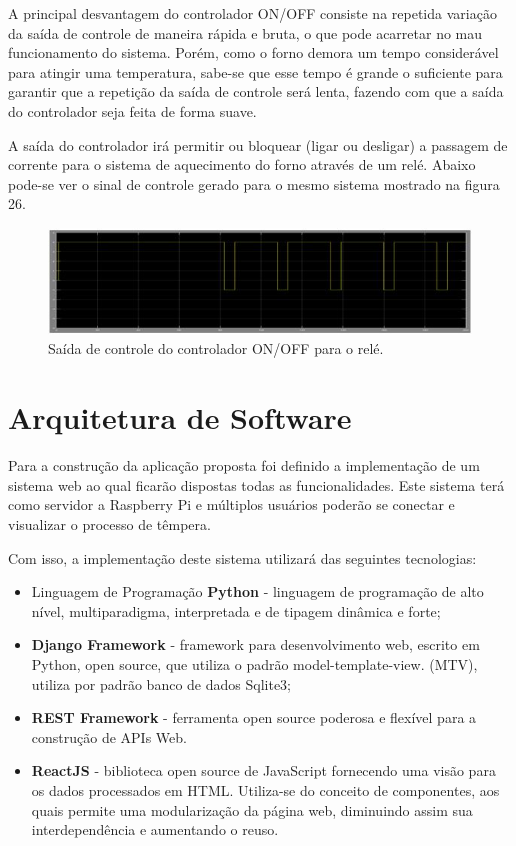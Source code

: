 A principal desvantagem do controlador ON/OFF consiste na repetida variação da saída de controle de maneira rápida e bruta, o que pode acarretar no mau funcionamento do sistema. Porém, como o forno demora um tempo considerável para atingir uma temperatura, sabe-se que esse tempo é grande o suficiente para garantir que a repetição da saída de controle será lenta, fazendo com que a saída do controlador seja feita de forma suave.

A saída do controlador irá permitir ou bloquear (ligar ou desligar) a passagem de corrente para o sistema de aquecimento do forno através de um relé. Abaixo pode-se ver o sinal de controle gerado para o mesmo sistema mostrado na figura 26.

\begin{figure}[h]
	\centering
	\label{saida_controle}
	\includegraphics[keepaspectratio=true,scale=0.8]{figuras/saida_controle.JPG}
	\caption{Saída de controle do controlador ON/OFF para o relé.}
\end{figure}

\section{Arquitetura de Software}

Para a construção da aplicação proposta foi definido a implementação de um sistema web ao qual ficarão dispostas todas as funcionalidades. Este sistema terá como servidor a Raspberry Pi e múltiplos usuários poderão se conectar e visualizar o processo de têmpera.

Com isso, a implementação deste sistema utilizará das seguintes tecnologias:
\begin{itemize}
	\item Linguagem de Programação \textbf{Python} - linguagem de programação de alto nível, multiparadigma, interpretada e de tipagem dinâmica e forte;
	\item \textbf{Django Framework} - framework para desenvolvimento web, escrito em Python, open source, que utiliza o padrão model-template-view. (MTV), utiliza por padrão banco de dados Sqlite3;
	\item \textbf{REST Framework} -  ferramenta open source poderosa e flexível para a construção de APIs Web.
	\item \textbf{ReactJS} - biblioteca open source de JavaScript fornecendo uma visão para os dados processados em HTML\@. Utiliza-se do conceito de componentes, aos quais permite uma modularização da página web, diminuindo assim sua interdependência e aumentando o reuso.

\end{itemize}


